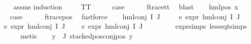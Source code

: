 \begin{isabellebody}
%
\isadelimproof
\ \ %
\endisadelimproof
%
\isatagproof
{}\isamarkupfalse%
\ assms\isanewline
{}\isamarkupfalse%
{\isacharparenleft}{\kern0pt}induction\ {\isasymphi}{\isacharparenright}{\kern0pt}\isanewline
\ \ \isamarkupfalse%
\ TT\isanewline
\ \ \isamarkupfalse%
\ \isamarkupfalse%
\ {\isacharquery}{\kern0pt}case\isanewline
\ \ \ \ \isamarkupfalse%
\ f{\isacharunderscore}{\kern0pt}trace{\isacharunderscore}{\kern0pt}tt\ \isamarkupfalse%
\ blast\isanewline
{}\isamarkupfalse%
\isanewline
\ \ \isamarkupfalse%
\ {\isacharparenleft}{\kern0pt}hml{\isacharunderscore}{\kern0pt}pos\ x{}\ {\isasymphi}{\isacharparenright}{\kern0pt}\isanewline
\ \ \isamarkupfalse%
\ \isamarkupfalse%
\ {\isacharquery}{\kern0pt}case\isanewline
\ \ \ \ \isamarkupfalse%
\ f{\isacharunderscore}{\kern0pt}trace{\isacharunderscore}{\kern0pt}pos\ \isamarkupfalse%
\ fastforce\isanewline
{}\isamarkupfalse%
\isanewline
\ \ \isamarkupfalse%
\ {\isacharparenleft}{\kern0pt}hml{\isacharunderscore}{\kern0pt}conj\ I\ J\ {\isasymPhi}{\isacharparenright}{\kern0pt}\isanewline
\ \ \isamarkupfalse%
\ e{}{\isacharcolon}{\kern0pt}\ {\isachardoublequoteopen}expr{\isacharunderscore}{\kern0pt}{}\ {\isacharparenleft}{\kern0pt}hml{\isacharunderscore}{\kern0pt}conj\ I\ J\ {\isasymPhi}{\isacharparenright}{\kern0pt}\ {\isasymle}\ {}{\isachardoublequoteclose}\isanewline
{}\ e{}{\isacharcolon}{\kern0pt}\ {\isachardoublequoteopen}expr{\isacharunderscore}{\kern0pt}{}\ {\isacharparenleft}{\kern0pt}hml{\isacharunderscore}{\kern0pt}conj\ I\ J\ {\isasymPhi}{\isacharparenright}{\kern0pt}\ {\isasymle}\ {}{\isachardoublequoteclose}\isanewline
{}\ e{}{\isacharcolon}{\kern0pt}\ {\isachardoublequoteopen}expr{\isacharunderscore}{\kern0pt}{}\ {\isacharparenleft}{\kern0pt}hml{\isacharunderscore}{\kern0pt}conj\ I\ J\ {\isasymPhi}{\isacharparenright}{\kern0pt}\ {\isasymle}\ {}{\isachardoublequoteclose}\isanewline
\ \ \ \ \isamarkupfalse%
\ expr{\isachardot}{\kern0pt}simps\ less{\isacharunderscore}{\kern0pt}eq{\isacharunderscore}{\kern0pt}t{\isachardot}{\kern0pt}simps\isanewline
\ \ \ \ \isamarkupfalse%
\ metis{\isacharplus}{\kern0pt}\isanewline
\ \ \isamarkupfalse%
\ {\isachardoublequoteopen}{\isasymforall}y{\isasymin}{\isasymPhi}\ {\isacharbackquote}{\kern0pt}\ J{\isachardot}{\kern0pt}\ stacked{\isacharunderscore}{\kern0pt}pos{\isacharunderscore}{\kern0pt}conj{\isacharunderscore}{\kern0pt}pos\ y{\isachardoublequoteclose}\isanewline

\end{isabellebody}
